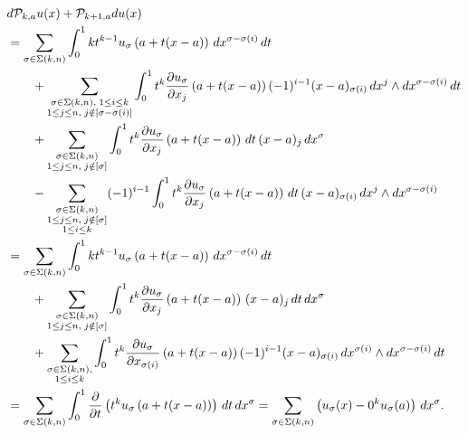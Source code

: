 \documentclass[10pt,a4paper]{article}
\begin{document}
\begin{align*}
    &
    d {\mathcal P}_{k,a} u(x)
    +
    {\mathcal P}_{k+1,a} d u(x)
    \\&
    =
    \sum_{\sigma \in \Sigma(k,n)} 
    \int_{0}^{1} 
    k t^{k-1} u_{\sigma}\left(a+t(x-a)\right) \,dx^{\sigma-\sigma(i)} \,dt 
    \\&\qquad
    + 
    \sum_{\substack{ \sigma \in \Sigma(k,n), \; 1 \leq i \leq k \\ 1 \leq j \leq n, \; j \notin [\sigma-\sigma(i)] }}
    \int_{0}^{1} 
    t^{k} \frac{ \partial u_{\sigma} }{\partial x_{j}}\left(a+t(x-a)\right) (-1)^{i-1} (x-a)_{\sigma(i) } \,dx^{j} \wedge dx^{\sigma-\sigma(i)} \,dt 
    \\&\qquad
    +
    \sum_{\substack{ \sigma \in \Sigma(k,n) \\ 1 \leq j \leq n, \; j \notin [\sigma] }} 
    \int_{0}^{1} t^{k} \frac{ \partial u_{\sigma} }{\partial x_{j}}\left(a+t(x-a)\right) \,dt \,(x-a)_{j} \,dx^{\sigma}
    \\&\qquad
    - 
    \sum_{\substack{ \sigma \in \Sigma(k,n) \\ 1 \leq j \leq n, \; j \notin [\sigma] \\ 1 \leq i \leq k }}
    (-1)^{i-1}
    \int_{0}^{1} t^{k} \frac{ \partial u_{\sigma} }{\partial x_{j}}\left(a+t(x-a)\right) \,dt 
    \,(x-a)_{\sigma(i)} \,dx^{j} \wedge dx^{\sigma-\sigma(i)}
    \\&
    =
    \sum_{\sigma \in \Sigma(k,n)} 
    \int_{0}^{1} 
    k t^{k-1} u_{\sigma}\left(a+t(x-a)\right) \,dx^{\sigma-\sigma(i)} \,dt 
    \\&\qquad
    +
    \sum_{\substack{ \sigma \in \Sigma(k,n) \\ 1 \leq j \leq n, \; j \notin [\sigma] }} 
    \int_{0}^{1} t^{k} \frac{ \partial u_{\sigma} }{\partial x_{j}}\left(a+t(x-a)\right) \,(x-a)_{j} \,dt \,dx^{\sigma}
    \\&\qquad
    + 
    \sum_{\substack{ \sigma \in \Sigma(k,n), \\ 1 \leq i \leq k }}
    \int_{0}^{1} 
    t^{k} \frac{ \partial u_{\sigma} }{\partial x_{\sigma(i)}}\left(a+t(x-a)\right) (-1)^{i-1} (x-a)_{\sigma(i) } \,dx^{\sigma(i)} \wedge dx^{\sigma-\sigma(i)} \,dt 
    \\&
    =
    \sum_{\sigma \in \Sigma(k,n)} 
    \int_{0}^{1} \frac{\partial}{\partial t} \left( t^{k} u_{\sigma}\left(a+t(x-a)\right) \right) \,dt \,dx^{\sigma}
    =
    \sum_{\sigma \in \Sigma(k,n)} 
    \left( u_{\sigma}(x) - 0^k u_{\sigma}(a) \right) \,dx^{\sigma}
    .
\end{align*}
\end{document}

